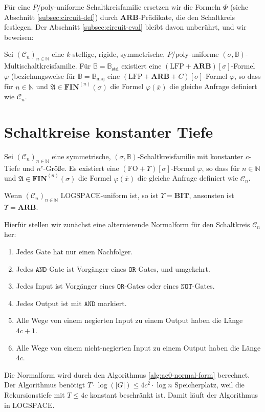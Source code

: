 Für eine $P/\mathrm{poly}$-uniforme Schaltkreisfamilie ersetzen wir
die Formeln $\Phi$ (siehe Abschnitt \ref{subsec:circuit-def}) durch
$\mathbf{ARB}$-Prädikate, die den Schaltkreis festlegen. Der Abschnitt
\ref{subsec:circuit-eval} bleibt davon unberührt, und wir beweisen:
\begin{lem}
Sei $\left(\mathcal{C}_{n}\right)_{n\in\mathbb{N}}$ eine $k$-stellige,
rigide, symmetrische, $P/\mathrm{poly}$-uniforme $\left(\sigma,\mathbb{B}\right)$-Multischaltkreisfamilie.
Für $\mathbb{B}=\mathbb{B}_{\mathrm{std}}$ existiert eine $\left(\mathrm{LFP}+\mathbf{ARB}\right)\left[\sigma\right]$-Formel
$\varphi$ (beziehungsweise für $\mathbb{B}=\mathbb{B}_{\mathrm{maj}}$
eine $\left(\mathrm{LFP}+\mathbf{ARB}+C\right)\left[\sigma\right]$-Formel
$\varphi$, so dass für $n\in\mathbb{N}$ und $\mathfrak{A}\in\mathbf{FIN}^{\left(n\right)}\left(\sigma\right)$
die Formel $\varphi\left(\bar{x}\right)$ die gleiche Anfrage definiert
wie $\mathcal{C}_{n}$.
\end{lem}

\section{Schaltkreise konstanter Tiefe}
\begin{lem}
\label{lem:ac0-fo}Sei $\left(\mathcal{C}_{n}\right)_{n\in\mathbb{N}}$
eine symmetrische, $\left(\sigma,\mathbb{B}\right)$-Schaltkreisfamilie
mit konstanter $c$-Tiefe und $n^{c}$-Größe. Es existiert eine $\left(\mathrm{FO}+\Upsilon\right)\left[\sigma\right]$-Formel
$\varphi$, so dass für $n\in\mathbb{N}$ und $\mathfrak{A}\in\mathbf{FIN}^{\left(n\right)}\left(\sigma\right)$
die Formel $\varphi\left(\bar{x}\right)$ die gleiche Anfrage definiert
wie $\mathcal{C}_{n}$.

Wenn $\left(\mathcal{C}_{n}\right)_{n\in\mathbb{N}}$ $\mathrm{LOGSPACE}$-uniform
ist, so ist $\Upsilon=\mathbf{BIT}$, ansonsten ist $\Upsilon=\mathbf{ARB}$.
\end{lem}
Hierfür stellen wir zunächst eine alternierende Normalform für den
Schaltkreis $\mathcal{C}_{n}$ her:
\begin{enumerate}
\item Jedes Gate hat nur einen Nachfolger.
\item Jedes $\mathtt{AND}$-Gate ist Vorgänger eines $\mathtt{OR}$-Gates,
und umgekehrt.
\item Jedes Input ist Vorgänger eines $\mathtt{OR}$-Gates oder eines $\mathtt{NOT}$-Gates.
\item Jedes Output ist mit $\mathtt{AND}$ markiert.
\item Alle Wege von einem negierten Input zu einem Output haben die Länge
$4c+1$.
\item Alle Wege von einem nicht-negierten Input zu einem Output haben die
Länge $4c$.
\end{enumerate}
Die Normalform wird durch den Algorithmus \ref{alg:ac0-normal-form}
berechnet. Der Algorithmus benötigt $T\cdot\log\left(\left|G\right|\right)\leqslant4c^{2}\cdot\log n$
Speicherplatz, weil die Rekursionstiefe mit $T\leqslant4c$ konstant
beschränkt ist. Damit läuft der Algorithmus in $\mathrm{LOGSPACE}$.


